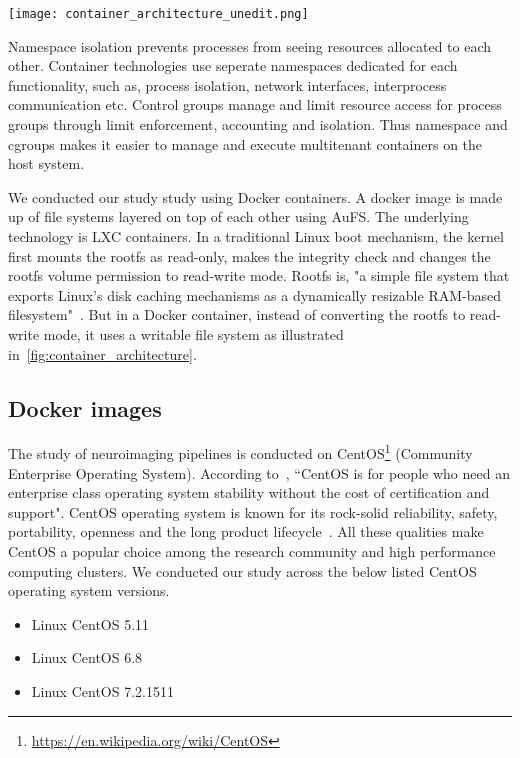 \begin{center}
   \texttt{[image: container\_architecture\_unedit.png]}
   \label{fig:container_architecture}
\end{center}

Namespace isolation prevents processes from seeing resources allocated to each other. Container technologies use seperate namespaces dedicated for each functionality, such as, process isolation, network interfaces, interprocess communication etc. Control groups manage and limit resource access for process groups through limit enforcement, accounting and isolation. Thus namespace and cgroups makes it easier to manage and execute multitenant containers on the host system.

We conducted our study study using Docker containers. A docker image is made up of file systems layered on top of each other using AuFS. The underlying technology is LXC containers. In a traditional Linux boot mechanism, the kernel first mounts the rootfs as read-only, makes the integrity check and changes the rootfs volume permission to read-write mode. Rootfs is, "a simple file system that exports Linux's disk caching mechanisms as a dynamically resizable RAM-based filesystem"~\cite{Rootfs}. But in a Docker container, instead of converting the rootfs to read-write mode, it uses a writable file system as illustrated in~\ref{fig:container_architecture}. 

\subsection{Docker images}
The study of neuroimaging pipelines is conducted on CentOS\footnote{\url{https://en.wikipedia.org/wiki/CentOS}} (Community Enterprise Operating System). According to~\cite{CentOS}, ``CentOS is for people who need an enterprise class operating system stability without the cost of certification and support". CentOS operating system is known for its rock-solid reliability, safety, portability, openness and the long product lifecycle~\cite{5665431}. All these qualities make CentOS a popular choice among the research community and
high performance computing clusters. We conducted our study across the below listed CentOS operating system versions.

\begin{itemize}
  \item Linux CentOS 5.11
  \item Linux CentOS 6.8
  \item Linux CentOS 7.2.1511
\end{itemize}

